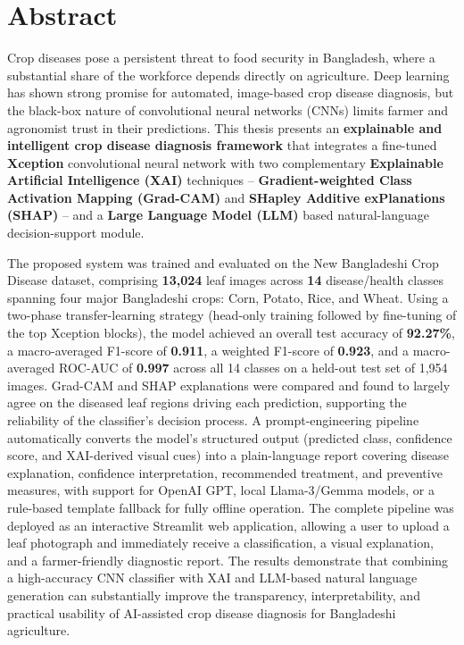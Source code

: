 \documentclass[12pt,a4paper,oneside]{report}
\begin{document}
\chapter*{Abstract}
Crop diseases pose a persistent threat to food security in Bangladesh, where a substantial share of the workforce
depends directly on agriculture. Deep learning has shown strong promise for automated, image-based crop disease
diagnosis, but the black-box nature of convolutional neural networks (CNNs) limits farmer and agronomist trust in
their predictions. This thesis presents an \textbf{explainable and intelligent crop disease diagnosis framework}
that integrates a fine-tuned \textbf{Xception} convolutional neural network with two complementary
\textbf{Explainable Artificial Intelligence (XAI)} techniques -- \textbf{Gradient-weighted Class Activation
Mapping (Grad-CAM)} and \textbf{SHapley Additive exPlanations (SHAP)} -- and a \textbf{Large Language Model (LLM)}
based natural-language decision-support module.

The proposed system was trained and evaluated on the New Bangladeshi Crop Disease dataset, comprising
\textbf{13,024} leaf images across \textbf{14} disease/health classes spanning four major Bangladeshi crops: Corn,
Potato, Rice, and Wheat. Using a two-phase transfer-learning strategy (head-only training followed by fine-tuning
of the top Xception blocks), the model achieved an overall test accuracy of \textbf{92.27\%}, a macro-averaged
F1-score of \textbf{0.911}, a weighted F1-score of \textbf{0.923}, and a macro-averaged ROC-AUC of \textbf{0.997}
across all 14 classes on a held-out test set of 1,954 images. Grad-CAM and SHAP explanations were compared and
found to largely agree on the diseased leaf regions driving each prediction, supporting the reliability of the
classifier's decision process. A prompt-engineering pipeline automatically converts the model's structured
output (predicted class, confidence score, and XAI-derived visual cues) into a plain-language report covering
disease explanation, confidence interpretation, recommended treatment, and preventive measures, with support for
OpenAI GPT, local Llama-3/Gemma models, or a rule-based template fallback for fully offline operation. The
complete pipeline was deployed as an interactive Streamlit web application, allowing a user to upload a leaf
photograph and immediately receive a classification, a visual explanation, and a farmer-friendly diagnostic
report. The results demonstrate that combining a high-accuracy CNN classifier with XAI and LLM-based natural
language generation can substantially improve the transparency, interpretability, and practical usability of
AI-assisted crop disease diagnosis for Bangladeshi agriculture.
\end{document}
